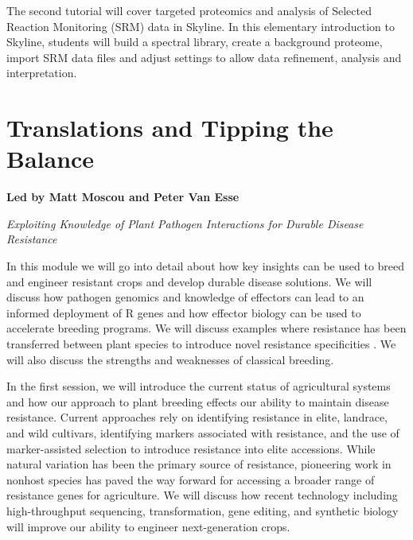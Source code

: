 \documentclass[12pt,]{book}
\theoremstyle{definition}
\theoremstyle{definition}
\theoremstyle{remark}
\begin{document}
The second tutorial will cover targeted proteomics and analysis of
Selected Reaction Monitoring (SRM) data in Skyline. In this elementary
introduction to Skyline, students will build a spectral library, create
a background proteome, import SRM data files and adjust settings to
allow data refinement, analysis and interpretation.

\chapter*{Translations and Tipping the
Balance}\label{translations-and-tipping-the-balance}

\textbf{Led by Matt Moscou and Peter Van Esse}

\emph{Exploiting Knowledge of Plant Pathogen Interactions for Durable
Disease Resistance}

In this module we will go into detail about how key insights can be used
to breed and engineer resistant crops and develop durable disease
solutions. We will discuss how pathogen genomics and knowledge of
effectors can lead to an informed deployment of R genes and how effector
biology can be used to accelerate breeding programs. We will discuss
examples where resistance has been transferred between plant species to
introduce novel resistance specificities
\citep{Kawashima:2016hx, Lacombe:2010ga, Tai:1999wa}. We will also
discuss the strengths and weaknesses of classical breeding.

In the first session, we will introduce the current status of
agricultural systems and how our approach to plant breeding effects our
ability to maintain disease resistance. Current approaches rely on
identifying resistance in elite, landrace, and wild cultivars,
identifying markers associated with resistance, and the use of
marker-assisted selection to introduce resistance into elite accessions.
While natural variation has been the primary source of resistance,
pioneering work in nonhost species has paved the way forward for
accessing a broader range of resistance genes for agriculture. We will
discuss how recent technology including high-throughput sequencing,
transformation, gene editing, and synthetic biology will improve our
ability to engineer next-generation crops.
\end{document}
